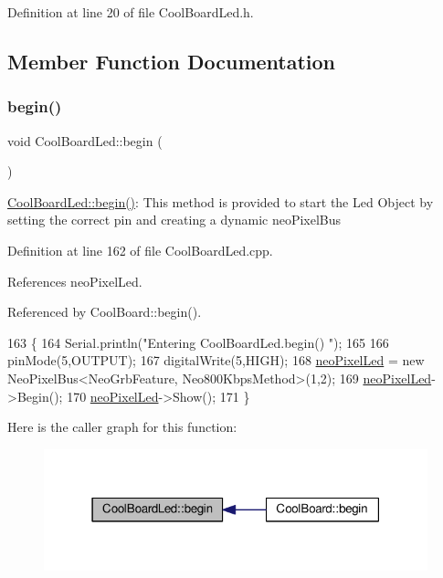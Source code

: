 Definition at line 20 of file Cool\+Board\+Led.\+h.



\subsection{Member Function Documentation}
\mbox{\label{classCoolBoardLed_ae3cbde8affcc6f011cbd698c8ef911f6}} 
\subsubsection{\texorpdfstring{begin()}{begin()}}
{\footnotesize\ttfamily void Cool\+Board\+Led\+::begin (\begin{DoxyParamCaption}{ }\end{DoxyParamCaption})}

\hyperlink{classCoolBoardLed_ae3cbde8affcc6f011cbd698c8ef911f6}{Cool\+Board\+Led\+::begin()}\+: This method is provided to start the Led Object by setting the correct pin and creating a dynamic neo\+Pixel\+Bus 

Definition at line 162 of file Cool\+Board\+Led.\+cpp.



References neo\+Pixel\+Led.



Referenced by Cool\+Board\+::begin().


\begin{DoxyCode}
163 \{
164     Serial.println(\textcolor{stringliteral}{"Entering CoolBoardLed.begin() "});
165 
166     pinMode(5,OUTPUT);
167     digitalWrite(5,HIGH);
168     \hyperlink{classCoolBoardLed_ac2c13fa462a010cd9242bf297c013923}{neoPixelLed} = \textcolor{keyword}{new} NeoPixelBus<NeoGrbFeature, Neo800KbpsMethod>(1,2); 
169     \hyperlink{classCoolBoardLed_ac2c13fa462a010cd9242bf297c013923}{neoPixelLed}->Begin();
170     \hyperlink{classCoolBoardLed_ac2c13fa462a010cd9242bf297c013923}{neoPixelLed}->Show();
171 \} 
\end{DoxyCode}
Here is the caller graph for this function\+:\nopagebreak
\begin{figure}[H]
\begin{center}
\leavevmode
\includegraphics[width=315pt]{classCoolBoardLed_ae3cbde8affcc6f011cbd698c8ef911f6_icgraph}
\end{center}
\end{figure}
\mbox{\label{classCoolBoardLed_a27706bc029f6a126c55d0b91624ad7fa}} 
